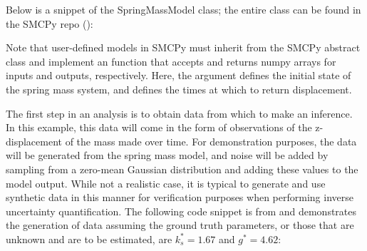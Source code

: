 \documentclass[letterpaper,10pt,english]{sphinxmanual}
\begin{document}
\begin{sphinxVerbatim}[commandchars=\\\{\}]
   
   
   
   
\end{sphinxVerbatim}

Below is a snippet of the SpringMassModel class; the entire class can be found in the SMCPy repo ():

\begin{sphinxVerbatim}[commandchars=\\\{\}]
   


 
       
\end{sphinxVerbatim}

Note that user-defined models in SMCPy must inherit from the SMCPy abstract class  and implement an   function that accepts and returns numpy arrays for inputs and outputs, respectively. Here, the  argument defines the initial state of the spring mass system, and  defines the times at which to return displacement.

The first step in an analysis is to obtain data from which to make an
inference. In this example, this data will come in the form of observations of
the z-displacement of the mass made over time. For demonstration purposes, the
data will be generated from the spring mass model, and noise will be added by
sampling from a zero-mean Gaussian distribution and adding these values to the
model output. While not a realistic case, it is typical to generate and use
synthetic data in this manner for verification purposes when performing inverse
uncertainty quantification. The following code snippet is from
 and demonstrates the generation of data assuming the
ground truth parameters, or those that are unknown and are to be estimated, are
\(k_s^*=1.67\) and \(g^*=4.62\):
\end{document}
